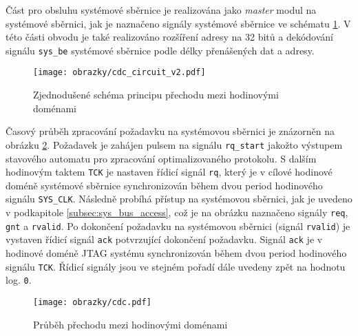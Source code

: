 Část pro obsluhu systémové sběrnice je realizována jako \textit{master} modul na systémové sběrnici, jak je naznačeno signály systémové sběrnice ve schématu \ref{fig:cdc_circuit}. V této části obvodu je také realizováno rozšíření adresy na 32 bitů a dekódování signálu \texttt{sys\_be} systémové sběrnice podle délky přenášených dat a adresy.

\begin{figure}[H]
  \begin{center}
    \texttt{[image: obrazky/cdc\_circuit\_v2.pdf]}
  \end{center}
  \caption{Zjednodušené schéma principu přechodu mezi hodinovými doménami}
	\label{fig:cdc_circuit}
\end{figure}

Časový průběh zpracování požadavku na systémovou sběrnici je znázorněn na obrázku \ref{fig:cdc}. Požadavek je zahájen pulsem na signálu \texttt{rq\_start} jakožto výstupem stavového automatu pro zpracování optimalizovaného protokolu. S dalším hodinovým taktem \texttt{\acs{TCK}} je nastaven řídicí signál \texttt{rq}, který je v cílové hodinové doméně systémové sběrnice synchronizován během dvou period hodinového signálu \texttt{SYS\_CLK}. Následně probíhá přístup na systémovou sběrnici, jak je uvedeno v podkapitole \ref{subsec:sys_bus_access}, což je na obrázku naznačeno signály \texttt{req}, \texttt{gnt} a \texttt{rvalid}. Po dokončení požadavku na systémovou sběrnici (signál \texttt{rvalid}) je vystaven  řídicí signál \texttt{ack} potvrzující dokončení požadavku. Signál \texttt{ack} je v hodinové doméně \acs{JTAG} systému synchronizován během dvou period hodinového signálu \texttt{\acs{TCK}}. Řídicí signály jsou ve stejném pořadí dále uvedeny zpět na hodnotu log. \texttt{0}.  

\begin{figure}[H]
  \begin{center}
    \texttt{[image: obrazky/cdc.pdf]}
  \end{center}
  \caption{Průběh přechodu mezi hodinovými doménami}
	\label{fig:cdc}
\end{figure}

